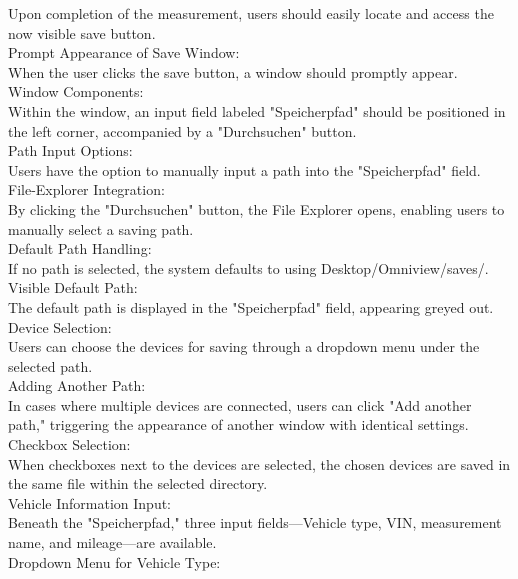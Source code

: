 \documentclass{scrreprt}
\begin{document}
Upon completion of the measurement, users should easily locate and access the now visible save button.\\
Prompt Appearance of Save Window:\\

When the user clicks the save button, a window should promptly appear.\\
Window Components:\\

Within the window, an input field labeled "Speicherpfad" should be positioned in the left corner, accompanied by a "Durchsuchen" button.\\
Path Input Options:\\

Users have the option to manually input a path into the "Speicherpfad" field.\\
File-Explorer Integration:\\

By clicking the "Durchsuchen" button, the File Explorer opens, enabling users to manually select a saving path.\\
Default Path Handling:\\

If no path is selected, the system defaults to using Desktop/Omniview/saves/.\\
Visible Default Path:\\

The default path is displayed in the "Speicherpfad" field, appearing greyed out.\\
Device Selection:\\

Users can choose the devices for saving through a dropdown menu under the selected path.\\
Adding Another Path:\\

In cases where multiple devices are connected, users can click "Add another path," triggering the appearance of another window with identical settings.\\
Checkbox Selection:\\

When checkboxes next to the devices are selected, the chosen devices are saved in the same file within the selected directory.\\
Vehicle Information Input:\\

Beneath the "Speicherpfad," three input fields—Vehicle type, VIN, measurement name, and mileage—are available.\\
Dropdown Menu for Vehicle Type:\\
\end{document}
